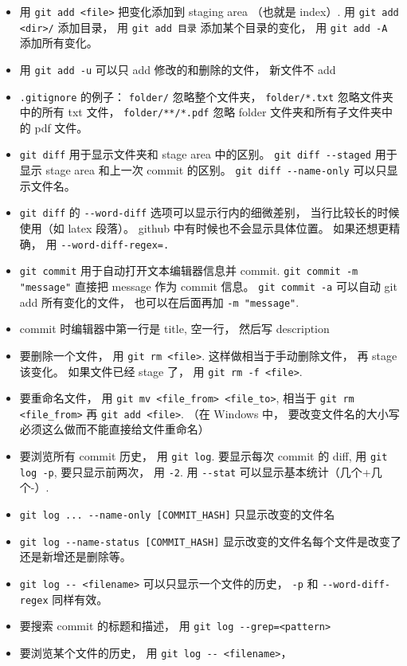\begin{itemize}
\item 用 \verb|git add <file>| 把变化添加到 staging area （也就是 index）. 用 \verb|git add <dir>/| 添加目录， 用 \verb|git add 目录| 添加某个目录的变化， 用 \verb|git add -A| 添加所有变化。
\item 用 \verb|git add -u| 可以只 add 修改的和删除的文件， 新文件不 add
\item \verb|.gitignore| 的例子： \verb|folder/| 忽略整个文件夹， \verb|folder/*.txt| 忽略文件夹中的所有 txt 文件， \verb|folder/**/*.pdf| 忽略 folder 文件夹和所有子文件夹中的 pdf 文件。
\item \verb|git diff| 用于显示文件夹和 stage area 中的区别。 \verb|git diff --staged| 用于显示 stage area 和上一次 commit 的区别。 \verb|git diff --name-only| 可以只显示文件名。
\item \verb|git diff| 的 \verb|--word-diff| 选项可以显示行内的细微差别， 当行比较长的时候使用（如 latex 段落）。 github 中有时候也不会显示具体位置。 如果还想更精确， 用 \verb|--word-diff-regex=.|
\item \verb|git commit| 用于自动打开文本编辑器信息并 commit. \verb|git commit -m "message"| 直接把 message 作为 commit 信息。 \verb|git commit -a| 可以自动 git add 所有变化的文件， 也可以在后面再加 \verb|-m "message"|.
\item commit 时编辑器中第一行是 title, 空一行， 然后写 description
\item 要删除一个文件， 用 \verb|git rm <file>|. 这样做相当于手动删除文件， 再 stage 该变化。 如果文件已经 stage 了， 用 \verb|git rm -f <file>|.
\item 要重命名文件， 用 \verb|git mv <file_from> <file_to>|, 相当于 \verb|git rm <file_from>| 再 \verb|git add <file>|. （在 Windows 中， 要改变文件名的大小写必须这么做而不能直接给文件重命名）
\item 要浏览所有 commit 历史， 用 \verb|git log|. 要显示每次 commit 的 diff, 用 \verb|git log -p|, 要只显示前两次， 用 \verb|-2|. 用 \verb|--stat| 可以显示基本统计（几个+几个-）.
\item \verb|git log ... --name-only [COMMIT_HASH]| 只显示改变的文件名
\item \verb|git log --name-status [COMMIT_HASH]| 显示改变的文件名每个文件是改变了还是新增还是删除等。
\item \verb|git log -- <filename>| 可以只显示一个文件的历史， \verb|-p| 和 \verb|--word-diff-regex| 同样有效。
\item 要搜索 commit 的标题和描述， 用 \verb|git log --grep=<pattern>|
\item 要浏览某个文件的历史， 用 \verb|git log -- <filename>|， 

\end{itemize}
